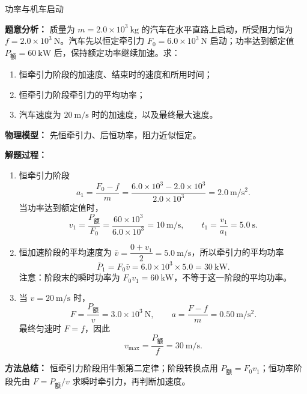 \begin{examplebox}{功率与机车启动}

\textbf{题意分析：} 质量为 $m=2.0\times10^3\ \mathrm{kg}$ 的汽车在水平直路上启动，所受阻力恒为 $f=2.0\times10^3\ \mathrm{N}$。汽车先以恒定牵引力
$F_0=6.0\times10^3\ \mathrm{N}$ 启动；功率达到额定值
$P_{\text{额}}=60\ \mathrm{kW}$ 后，保持额定功率继续加速。求：
\begin{enumerate}
  \item 恒牵引力阶段的加速度、结束时的速度和所用时间；
  \item 恒牵引力阶段牵引力的平均功率；
  \item 汽车速度为 $20\ \mathrm{m/s}$ 时的加速度，以及最终最大速度。
\end{enumerate}

\textbf{物理模型：} 先恒牵引力、后恒功率，阻力近似恒定。

\textbf{解题过程：}
\begin{enumerate}
  \item 恒牵引力阶段
  \[
  a_1=\frac{F_0-f}{m}
     =\frac{6.0\times10^3-2.0\times10^3}{2.0\times10^3}
     =2.0\ \mathrm{m/s^2}.
  \]
  当功率达到额定值时，
  \[
  v_1=\frac{P_{\text{额}}}{F_0}
     =\frac{60\times10^3}{6.0\times10^3}
     =10\ \mathrm{m/s},
  \qquad
  t_1=\frac{v_1}{a_1}=5.0\ \mathrm{s}.
  \]

  \item 恒加速阶段的平均速度为
  $\bar v=\dfrac{0+v_1}{2}=5.0\ \mathrm{m/s}$，所以牵引力的平均功率
  \[
  \bar P_1=F_0\bar v
          =6.0\times10^3\times5.0
          =30\ \mathrm{kW}.
  \]
  注意：阶段末的瞬时功率为 $F_0v_1=60\ \mathrm{kW}$，不等于这一阶段的平均功率。

  \item 当 $v=20\ \mathrm{m/s}$ 时，
  \[
  F=\frac{P_{\text{额}}}{v}=3.0\times10^3\ \mathrm{N},
  \qquad
  a=\frac{F-f}{m}=0.50\ \mathrm{m/s^2}.
  \]
  最终匀速时 $F=f$，因此
  \[
  v_{\max}=\frac{P_{\text{额}}}{f}
          =30\ \mathrm{m/s}.
  \]
\end{enumerate}

\textbf{方法总结：} 恒牵引力阶段用牛顿第二定律；阶段转换点用
$P_{\text{额}}=F_0v_1$；恒功率阶段先由 $F=P_{\text{额}}/v$ 求瞬时牵引力，再判断加速度。

\end{examplebox}

